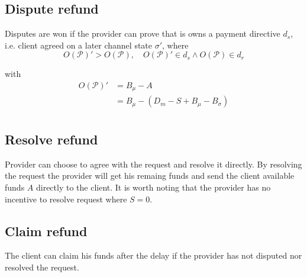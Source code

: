 \documentclass{llncs}
\begin{document}
\subsection{Dispute refund} Disputes are won if the provider can prove that is owns a payment directive $d_s$, i.e. client agreed on a later channel state $\sigma'$, where
$$O(\mathcal{P})' > O(\mathcal{P}), \quad O(\mathcal{P})' \in d_s \land O(\mathcal{P}) \in d_r$$

with
\begin{equation*}
\begin{split}
    O(\mathcal{P})' &= B_\mu - A \\
    &= B_\mu - (D_m - S + B_\mu - B_\sigma) \\
\end{split}
\end{equation*}

\subsection{Resolve refund} Provider can choose to agree with the request and resolve it directly. By resolving the request the provider will get his remaing funds and send the client available funds $A$ directly to the client. It is worth noting that the provider has no incentive to resolve request where $S = 0$.

\subsection{Claim refund} The client can claim his funds after the delay if the provider has not disputed nor resolved the request.


%
%
\printbibliography
\end{document}
